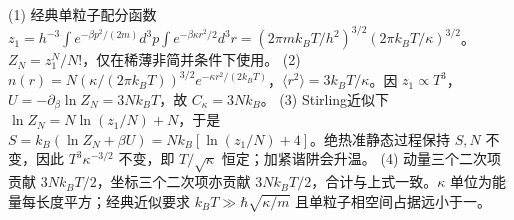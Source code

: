 (1) 经典单粒子配分函数 \(z_1=h^{-3}\int e^{-\beta p^2/(2m)}d^3p\int e^{-\beta\kappa r^2/2}d^3r=(2\pi mk_BT/h^2)^{3/2}(2\pi k_BT/\kappa)^{3/2}\)。\(Z_N=z_1^N/N!\)，仅在稀薄非简并条件下使用。
(2) \(n(r)=N(\kappa/(2\pi k_BT))^{3/2}e^{-\kappa r^2/(2k_BT)}\)，\(\langle r^2\rangle=3k_BT/\kappa\)。因 \(z_1\propto T^3\)，\(U=-\partial_\beta\ln Z_N=3Nk_BT\)，故 \(C_\kappa=3Nk_B\)。
(3) Stirling近似下 \(\ln Z_N=N\ln(z_1/N)+N\)，于是 \(S=k_B(\ln Z_N+\beta U)=Nk_B[\ln(z_1/N)+4]\)。绝热准静态过程保持 \(S,N\) 不变，因此 \(T^3\kappa^{-3/2}\) 不变，即 \(T/\sqrt\kappa\) 恒定；加紧谐阱会升温。
(4) 动量三个二次项贡献 \(3Nk_BT/2\)，坐标三个二次项亦贡献 \(3Nk_BT/2\)，合计与上式一致。\(\kappa\) 单位为能量每长度平方；经典近似要求 \(k_BT\gg\hbar\sqrt{\kappa/m}\) 且单粒子相空间占据远小于一。
